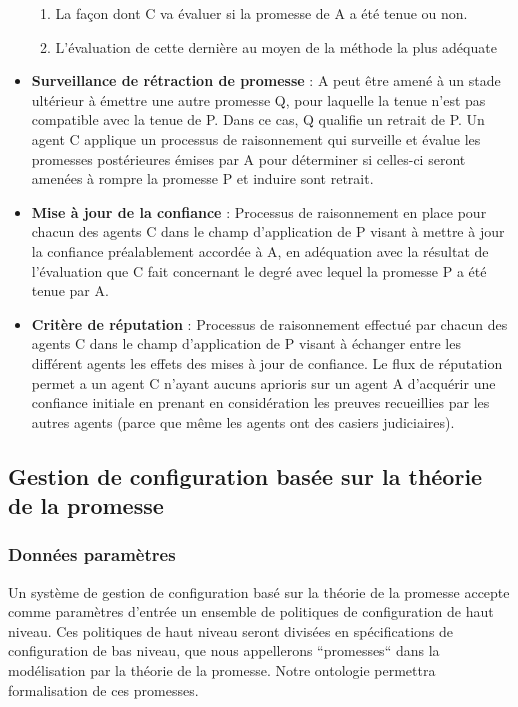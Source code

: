 \begin{itemize}
  	\begin{enumerate}
	  \item La façon dont C va évaluer si la promesse de A a été tenue ou
		  non.
      \item L'évaluation de cette dernière au moyen de la méthode la plus
          adéquate
  	\end{enumerate}
  \item \textbf{Surveillance de rétraction de promesse} :
	A peut être amené à un stade ultérieur à émettre une autre promesse Q,
	pour laquelle la tenue n'est pas compatible avec la tenue de P. Dans ce
	cas, Q qualifie un retrait de P. Un agent C applique un processus de
	raisonnement qui surveille et évalue les promesses postérieures émises
	par A pour déterminer si celles-ci seront amenées à rompre la promesse P
	et induire sont retrait.
  \item \textbf{Mise à jour de la confiance} :
	Processus de raisonnement en place pour chacun des agents C dans le champ
	d'application de P visant à mettre à jour la confiance préalablement
	accordée à A, en adéquation avec la résultat de l'évaluation que C fait
	concernant le degré avec lequel la promesse P a été tenue par A.
  \item \textbf{Critère de réputation} :
	Processus de raisonnement effectué par chacun des agents C dans le champ
	d'application de P visant à échanger entre les différent agents les
	effets des mises à jour de confiance. Le flux de réputation permet a un
	agent C n'ayant aucuns aprioris sur un agent A d'acquérir une confiance
	initiale en prenant en considération les preuves recueillies par les
    autres agents (parce que même les agents ont des casiers judiciaires).
\end{itemize}

\subsection{Gestion de configuration basée sur la théorie de la promesse}

\subsubsection{Données paramètres}

Un système de gestion de configuration basé sur la théorie de la promesse
accepte comme paramètres d'entrée un ensemble de politiques de configuration de
haut niveau. Ces politiques de haut niveau seront divisées en spécifications de
configuration de bas niveau, que nous appellerons ``promesses`` dans la
modélisation par la théorie de la promesse. Notre ontologie permettra
formalisation de ces promesses.

